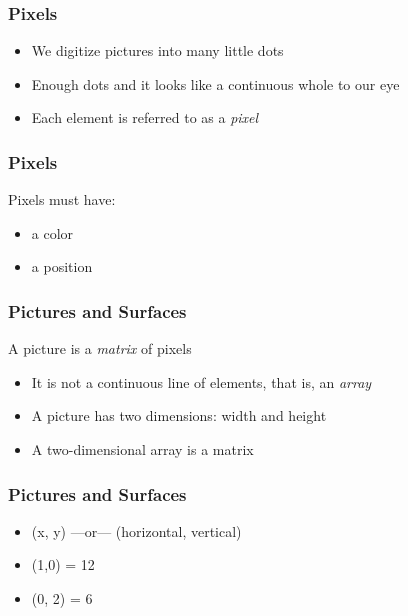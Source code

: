 
\begin{frame}
	\frametitle{Pixels}
	\begin{itemize}
		\item We digitize pictures into many little dots
		\item Enough dots and it looks like a continuous whole to our eye
		\item Each element is referred to as a \textit{pixel}
	\end{itemize}
\end{frame}

\begin{frame}
	\frametitle{Pixels}
	
	Pixels must have:
	
	\begin{itemize}
		\item a color
		\item a position
	\end{itemize}
\end{frame}

\begin{frame}
	\frametitle{Pictures and Surfaces}
	
	A picture is a \textit{matrix} of pixels
	
	\begin{itemize}
		\item It is not a continuous line of elements, that is, an \textit{array}
		\item A picture has two dimensions: width and height
		\item A two-dimensional array is a matrix
	\end{itemize}
\end{frame}



\begin{frame}
	\frametitle{Pictures and Surfaces}
	
	\begin{itemize}
		\item (x, y) ---or--- (horizontal, vertical)
		\item (1,0) = 12
		\item (0, 2) = 6
	\end{itemize}
\end{frame}

